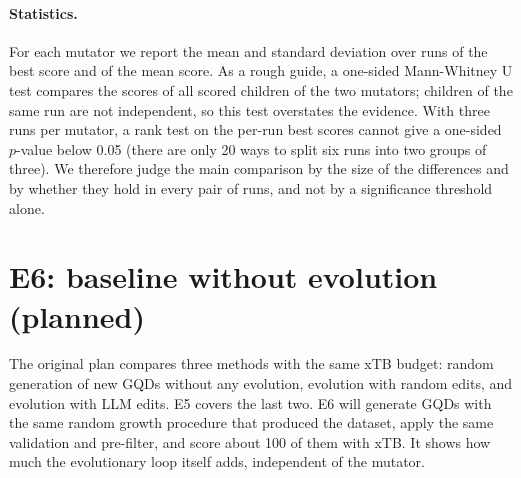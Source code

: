 \paragraph{Statistics.} For each mutator we report the mean and standard deviation over runs of
the best score and of the mean score. As a rough guide, a one-sided Mann-Whitney U test
\cite{mannwhitney1947} compares the scores of all scored children of the two mutators; children of
the same run are not independent, so this test overstates the evidence. With three runs per
mutator, a rank test on the per-run best scores cannot give a one-sided \(p\)-value below 0.05
(there are only 20 ways to split six runs into two groups of three). We therefore judge the main
comparison by the size of the differences and by whether they hold in every pair of runs, and not
by a significance threshold alone.

\section{E6: baseline without evolution (planned)}
\label{sec:e6}

The original plan compares three methods with the same xTB budget: random generation of new GQDs
without any evolution, evolution with random edits, and evolution with LLM edits. E5 covers the
last two. E6 will generate GQDs with the same random growth procedure that produced the dataset,
apply the same validation and pre-filter, and score about 100 of them with xTB. It shows how much
the evolutionary loop itself adds, independent of the mutator.
